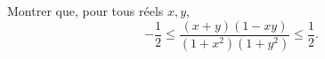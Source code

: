 Montrer que, pour tous réels $x, y$,
\[ -\frac{1}{2} \leq \frac{(x + y)(1 - xy)}{(1 + x^2)(1 + y^2)} \leq \frac{1}{2}. \]

